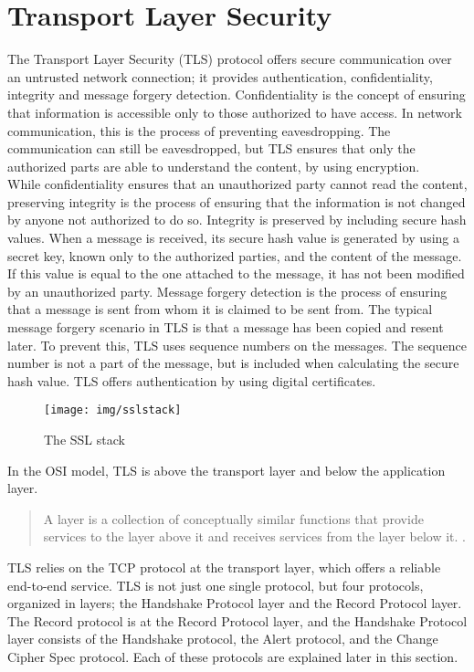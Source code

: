 \documentclass[12pt,a4paper,titlepage]{report}
\begin{document}
\section{Transport Layer Security}
\label{sec:theory:tls}
The Transport Layer Security (TLS) protocol offers secure communication over an untrusted network connection; it provides authentication, confidentiality, integrity and message forgery detection. Confidentiality is the concept of ensuring that information is accessible only to those authorized to have access. In network communication, this is the process of preventing eavesdropping. The communication can still be eavesdropped, but TLS ensures that only the authorized parts are able to understand the content, by using encryption. \\
While confidentiality ensures that an unauthorized party cannot read the content, preserving integrity is the process of ensuring that the information is not changed by anyone not authorized to do so. Integrity is preserved by including secure hash values. When a message is received, its secure hash value is generated by using a secret key, known only to the authorized parties, and the content of the message. If this value is equal to the one attached to the message, it has not been modified by an unauthorized party. Message forgery detection is the process of ensuring that a message is sent from whom it is claimed to be sent from. The typical message forgery scenario in TLS is that a message has been copied and resent later. To prevent this, TLS uses sequence numbers on the messages. The sequence number is not a part of the message, but is included when calculating the secure hash value.
TLS offers authentication by using digital certificates. \cite{iso27001,sansinstitute,morrissey}


\begin{figure}[H]
\begin{center}
\texttt{[image: img/sslstack]}
\caption{The SSL stack}
\end{center}
\end{figure}

In the OSI model, TLS is above the transport layer and below the application layer. 
\begin{quote}
A layer is a collection of conceptually similar functions that provide services to the layer above it and receives services from the layer below it. \cite{wikiosi}. 
\end{quote}
TLS relies on the TCP protocol at the transport layer, which offers a reliable end-to-end service.
TLS is not just one single protocol, but four protocols, organized in layers; the Handshake Protocol layer and the Record Protocol layer. The Record protocol is at the Record Protocol layer, and the Handshake Protocol layer consists of the Handshake protocol, the Alert protocol, and the Change Cipher Spec protocol. Each of these protocols are explained later in this section. \cite{rfc2246,berbecaru, stallings}
\end{document}
